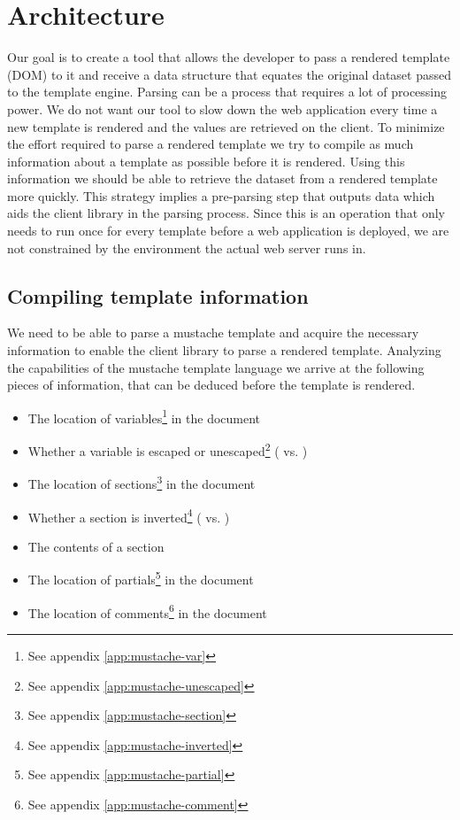 \documentclass[thesis.tex]{subfiles}
\begin{document}
\chapter{Architecture}
\label{chap:architecture}

Our goal is to create a tool that allows the developer to pass a rendered
template (DOM) to it and receive a data structure that equates the original
dataset passed to the template engine.
Parsing can be a process that requires a lot of processing power. We do not want
our tool to slow down the web application every time a new template is rendered
and the values are retrieved on the client. To minimize the effort required to
parse a rendered template we try to compile as much information about a template
as possible before it is rendered. Using this information we should be able
to retrieve the dataset from a rendered template more quickly.
This strategy implies a pre-parsing step that outputs data which aids
the client library in the parsing process.
Since this is an operation that only needs to run once for every template before
a web application is deployed,
we are not constrained by the environment the actual web server runs in.

\section{Compiling template information}
\label{sec:arch-comp-tpl}
We need to be able to parse a mustache template and acquire the necessary
information to enable the client library to parse a rendered template.
Analyzing the capabilities of the mustache template language we arrive
at the following pieces of information, that can be deduced before
the template is rendered.

\begin{itemize}
\item The location of variables\footnote{See appendix \ref{app:mustache-var}}
	in the document
\item Whether a variable is escaped or
	unescaped\footnote{See appendix \ref{app:mustache-unescaped}}
	( vs. )
\item The location of
	sections\footnote{See appendix \ref{app:mustache-section}} in the document
\item Whether a section is
	inverted\footnote{See appendix \ref{app:mustache-inverted}}
	( vs. )
\item The contents of a section
\item The location of partials\footnote{See appendix \ref{app:mustache-partial}}
	in the document
\item The location of comments\footnote{See appendix \ref{app:mustache-comment}}
	in the document
\end{itemize}
\end{document}

